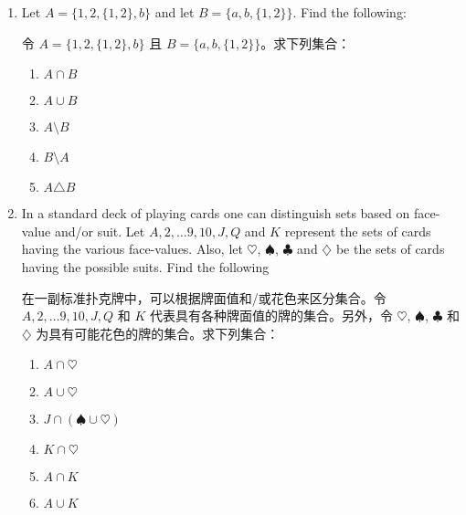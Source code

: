 \begin{enumerate}
  \item Let $A = \{1, 2, \{1, 2\}, b\}$ and let $B=\{a, b, \{1, 2\} \}$.
  Find the following:
  
  令 $A = \{1, 2, \{1, 2\}, b\}$ 且 $B=\{a, b, \{1, 2\} \}$。求下列集合：
    \begin{enumerate}
    \item \wbitemsep $A \cap B$   
    \item \wbitemsep $A \cup B$ 
    \item \wbitemsep $A \setminus B$ 
    \item \wbitemsep $B \setminus A$ 
    \item \wbitemsep $A \triangle B$ 
    \end{enumerate}
  
  \vfill
  
  
  \workbookpagebreak
  
  \item In a standard deck of playing cards one can distinguish sets
  based on face-value and/or suit.
  Let $A, 2, \ldots 9, 10, J, Q$ and $K$
  represent the sets of cards having the various face-values.
  Also, let
  $\heartsuit$, $\spadesuit$, $\clubsuit$ and $\diamondsuit$ be the 
  sets of cards having the possible suits.
  Find the following
  
  在一副标准扑克牌中，可以根据牌面值和/或花色来区分集合。令 $A, 2, \ldots 9, 10, J, Q$ 和 $K$ 代表具有各种牌面值的牌的集合。另外，令 $\heartsuit$, $\spadesuit$, $\clubsuit$ 和 $\diamondsuit$ 为具有可能花色的牌的集合。求下列集合：
    \begin{enumerate}
    \item \wbitemsep$A \cap \heartsuit$ 
    \item \wbitemsep$A \cup \heartsuit$ 
    \item \wbitemsep$J \cap (\spadesuit \cup \heartsuit)$ 
    \item \wbitemsep$K \cap \heartsuit$ 
    \item \wbitemsep$A \cap K$ \hint{$\emptyset$ }
    \item \wbitemsep$A \cup K$ 
    \end{enumerate}
  

\end{enumerate}
